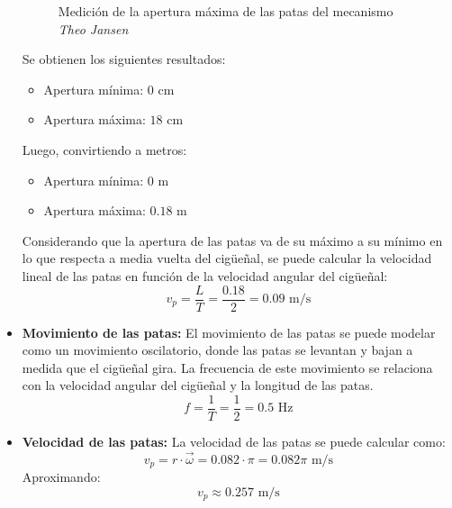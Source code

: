 \begin{multicols}{2}
\begin{itemize}
\begin{figure}[H]
      \caption{Medición de la apertura máxima de las patas del mecanismo \textit{Theo Jansen}}
      \label{fig:apertura_maxima_patas}
    \end{figure}
    Se obtienen los siguientes resultados:
    \begin{itemize}
      \item Apertura mínima: \(0 \text{ cm}\)
      \item Apertura máxima: \(18 \text{ cm}\)
      \end{itemize}

      Luego, convirtiendo a metros:
      \begin{itemize}
      \item Apertura mínima: \(0 \text{ m}\)
      \item Apertura máxima: \(0.18 \text{ m}\)
      \end{itemize}

    Considerando que la apertura de las patas va de su máximo a su mínimo en lo que respecta a media vuelta del cigüeñal, se puede calcular la velocidad lineal de las patas en función de la velocidad angular del cigüeñal:
    \begin{equation}
    v_p = \frac{L}{T} = \frac{0.18}{2} = 0.09 \text{ m/s}
    \end{equation}
    \item \textbf{Movimiento de las patas:} El movimiento de las patas se puede modelar como un movimiento oscilatorio, donde las patas se levantan y bajan a medida que el cigüeñal gira. La frecuencia de este movimiento se relaciona con la velocidad angular del cigüeñal y la longitud de las patas.
    \begin{equation}
    f = \frac{1}{T} = \frac{1}{2} = 0.5 \text{ Hz}
    \end{equation}
    \item \textbf{Velocidad de las patas:} La velocidad de las patas se puede calcular como:
    \begin{equation}
    v_p = r \cdot \vec{\omega} = 0.082 \cdot \pi = 0.082\pi \text{ m/s}
    \end{equation}
    Aproximando:
    \begin{equation}
    v_p \approx 0.257 \text{ m/s}
    \end{equation}
  \end{itemize}
\end{multicols}





\newpage

